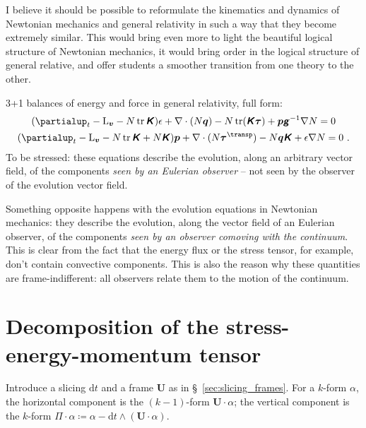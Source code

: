 \documentclass[\ifafour a4paper,12pt,\else a5paper,10pt,\fi%
onecolumn,oneside,article,%
british%
]{memoir}
\theoremstyle{remark}
\theoremstyle{innote}
\newcommand*{\mathte}[1]{\textbf{\textit{\textsf{#1}}}}
\newcommand*{\de}{\partialup}%
\newcommand*{\di}{\mathrm{d}}%
\DeclareMathOperator{\tr}{tr}%
\newcommand*{\defd}{\coloneqq}
\renewcommand*{\|}[1][]{\nonscript\,#1\vert\nonscript\;\mathopen{}}
\newcommand*{\sect}{\S}%
\newcommand*{\T}{^\transp}%
\newcommand*{\Li}{\mathrm{L}}
\newcommand*{\yqq}{q}
\newcommand*{\yq}{\bm{\yqq}}
\newcommand*{\yTT}{\tau}
\newcommand*{\yT}{\bm{\yTT}}
\newcommand*{\yFF}{U}
\newcommand*{\yF}{\bm{\yFF}}
\newcommand*{\ygg}{g}
\newcommand*{\yg}{\mathte{\ygg}}
\newcommand*{\yKK}{K}
\newcommand*{\yK}{\mathte{\yKK}}
\newcommand*{\ypp}{p}
\newcommand*{\yp}{\bm{\ypp}}
\newcommand*{\ye}{\epsilon}
\newcommand*{\ynab}{\nabla}
\newcommand*{\la}{N}
\newcommand*{\shi}{\bm{v}}
\newcommand*{\tpro}{\varPi}
\begin{document}
I believe it should be possible to reformulate the kinematics and dynamics
of Newtonian mechanics and general relativity in such a way that they
become extremely similar. This would bring even more to light the beautiful
logical structure of Newtonian mechanics, it would bring order in the
logical structure of general relative, and offer students a smoother
transition from one theory to the other.


\bigskip

3+1 balances of energy and force in general relativity, full form:
\begin{gather}
  \label{eq:balance_energy_full_gr}
  (\de_t -\Li_{\shi}-\la \tr\yK)\ye + \ynab\cdot(\la\yq) - \la\tr(\yK\yT) +\yp\yg^{-1}\ynab\la =0
  \\
  \label{eq:dt_momentum}
  (\de_t -\Li_{\shi}-\la \tr\yK+\la\yK)\yp
  + \ynab\cdot(\la\yT\T)
  - \la\yq\yK
  +\ye\ynab\la =0 \ .
\end{gather}
To be stressed: these equations describe the evolution, along an arbitrary
vector field, of the components \emph{seen by an Eulerian observer} -- not
seen by the observer of the evolution vector field.

Something opposite happens with the evolution equations in Newtonian
mechanics: they describe the evolution, along the vector field of an
Eulerian observer, of the components \emph{seen by an observer comoving
  with the continuum}. This is clear from the fact that the energy flux or
the stress tensor, for example, don't contain convective components. This
is also the reason why these quantities are frame-indifferent: all
observers relate them to the motion of the continuum.

\section{Decomposition of the stress-energy-momentum tensor}
\label{sec:decomp_stress-energy-momentum}

Introduce a slicing $\di t$ and a frame $\yF$ as in
\sect~\ref{sec:slicing_frames}. For a $k$-form $\alpha$, the horizontal
component is the $(k-1)$-form $\yF \cdot \alpha$; the vertical component is
the $k$-form $\tpro\cdot\alpha \defd \alpha - \di t \land (\yF \cdot \alpha)$.
\end{document}
